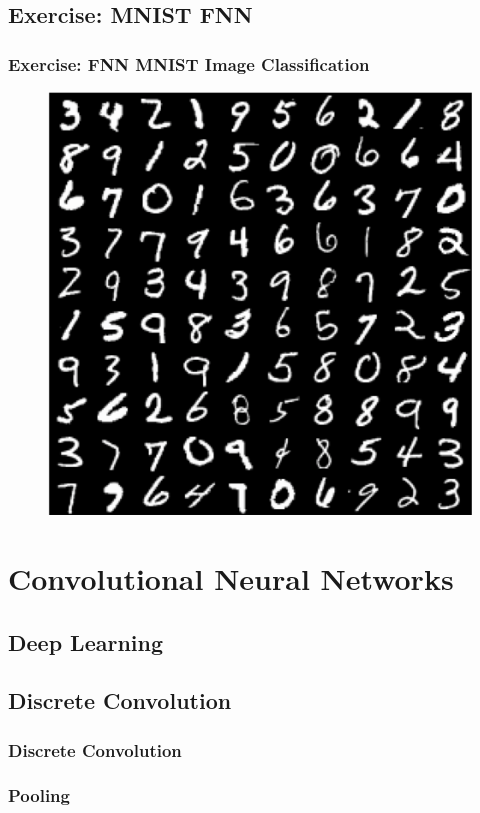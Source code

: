 \documentclass[aspectratio=169]{beamer}
\newcommand\imageright[1]{ %
    \caption*{\scalebox{.5}{\textcolor{lightgray}{\textcopyright~#1}}} %
}
\begin{document}
\subsection{Exercise: MNIST FNN}
\label{subsec:exercise-fnn}

\begin{frame}
    \frametitle{Exercise: FNN MNIST Image Classification}
    
    \begin{figure}
        \centering
        \includegraphics[width=0.4\linewidth]{mnist.png}
    \end{figure}
\end{frame}

\section{Convolutional Neural Networks}
\label{sec:convolutional-neural-networks}

\subsection{Deep Learning}
\label{subsec:deep-learning}

\subsection{Discrete Convolution}
\label{subsec:discrete-convolution}

\begin{frame}
    \frametitle{Discrete Convolution}
    \begin{figure}
        \centering
        \imageright{Machine Learning Guru}
    \end{figure}
\end{frame}

\begin{frame}
\frametitle{Pooling}
\end{frame}
\end{document}
